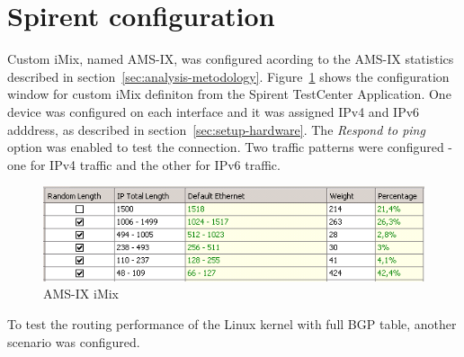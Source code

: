
\section{Spirent configuration}
Custom iMix, named AMS-IX, was configured acording to the AMS-IX statistics described in section~\ref{sec:analysis-metodology}.
Figure~\ref{fig:setup-amsix-imix} shows the configuration window for custom iMix definiton
from the Spirent TestCenter Application.
One device was configured on each interface and it was assigned IPv4 and IPv6 adddress, as described in section~\ref{sec:setup-hardware}.
The {\it{Respond to ping}} option was enabled to test the connection.
Two traffic patterns were configured - one for IPv4 traffic and the other for IPv6 traffic. %
\begin{figure}
	\centering
	\includegraphics[width=14.5cm,keepaspectratio]{fig/amsix-imix.png}
	\caption{AMS-IX iMix}
	\label{fig:setup-amsix-imix}
\end{figure}

To test the routing performance of the Linux kernel with full BGP table, 
another scenario was configured.
